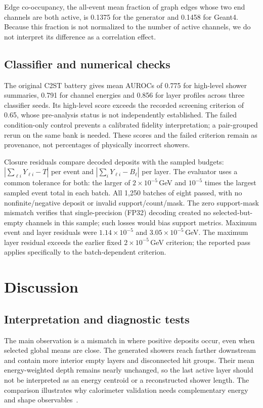 \documentclass[10pt]{article}
\begin{document}
Edge co-occupancy, the all-event mean fraction of graph edges whose two end channels are both active, is 0.1375 for the generator and 0.1458 for Geant4. Because this fraction is not normalized to the number of active channels, we do not interpret its difference as a correlation effect.

\subsection{Classifier and numerical checks}

The original C2ST battery gives mean AUROCs of 0.775 for high-level shower summaries, 0.791 for channel energies and 0.856 for layer profiles across three classifier seeds. Its high-level score exceeds the recorded screening criterion of 0.65, whose pre-analysis status is not independently established. The failed condition-only control prevents a calibrated fidelity interpretation; a pair-grouped rerun on the same bank is needed. These scores and the failed criterion remain as provenance, not percentages of physically incorrect showers.

Closure residuals compare decoded deposits with the sampled budgets: $|\sum_{\ell i}Y_{\ell i}-T|$ per event and $|\sum_iY_{\ell i}-B_\ell|$ per layer. The evaluator uses a common tolerance for both: the larger of $2\times10^{-5}$\,GeV and $10^{-5}$ times the largest sampled event total in each batch. All 1,250 batches of eight passed, with no nonfinite/negative deposit or invalid support/count/mask. The zero support-mask mismatch verifies that single-precision (FP32) decoding created no selected-but-empty channels in this sample; such losses would bias support metrics. Maximum event and layer residuals were $1.14\times10^{-5}$ and $3.05\times10^{-5}$\,GeV. The maximum layer residual exceeds the earlier fixed $2\times10^{-5}$\,GeV criterion; the reported pass applies specifically to the batch-dependent criterion.

\FloatBarrier
\section{Discussion}
\label{sec:discussion}

\subsection{Interpretation and diagnostic tests}

The main observation is a mismatch in where positive deposits occur, even when selected global means are close. The generated showers reach farther downstream and contain more interior empty layers and disconnected hit groups. Their mean energy-weighted depth remains nearly unchanged, so the last active layer should not be interpreted as an energy centroid or a reconstructed shower length. The comparison illustrates why calorimeter validation needs complementary energy and shape observables~\cite{calochallenge,kansalmetrics}.
\end{document}
